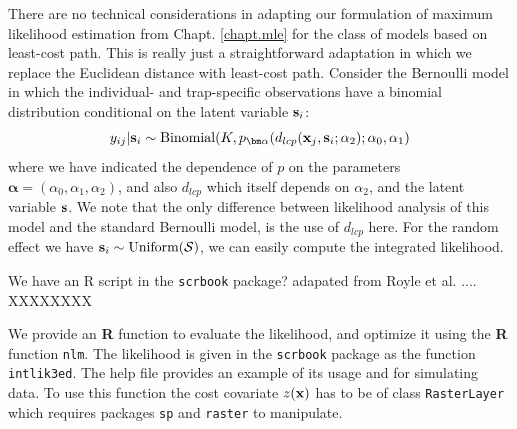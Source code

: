 There are no technical considerations in adapting our
 formulation of maximum likelihood estimation
\citep{borchers_efford:2008} from Chapt. \ref{chapt.mle} for the class
of models based on least-cost path. This is really just a
straightforward adaptation in which we replace the Euclidean distance
with least-cost path.
Consider the Bernoulli model in which 
the individual- and trap-specific observations have a binomial
distribution conditional on the latent variable ${\bf s}_{i}$:
\begin{equation}
  y_{ij}| {\bf s}_{i} \sim \mbox{Binomial}(K, p_{\bm \alpha}(d_{lcp}({\bf x}_{j},{\bf s}_{i};\alpha_{2}); \alpha_{0}, \alpha_{1})
\label{ecoldist.eq.cond-on-s}
\end{equation}
where we have indicated the dependence of $p$ on the parameters
${\bm \alpha} =(\alpha_{0},\alpha_{1},\alpha_{2})$, and also $d_{lcp}$ which
itself depends on $\alpha_{2}$, and the latent variable ${\bf s}$.
We note that the only difference between likelihood analysis of this
model and the standard Bernoulli model, is the use of $d_{lcp}$ here. 
For the random effect we have ${\bf s}_{i} \sim  \mbox{Uniform}({\cal
  S})$, we can easily compute the integrated likelihood.

We have an R script in the \mbox{\tt scrbook} package?
adapated from Royle et al. .... XXXXXXXX

We provide an {\bf R} function to evaluate the likelihood, and
optimize it 
using the {\bf R} function \mbox{\tt nlm}.
The likelihood is given in the {\tt scrbook} package as the function
\mbox{\tt intlik3ed}. The help file
provides an example of its usage and for simulating data.
To use this function the cost covariate $z({\bf x})$ has to be of class
\mbox{\tt RasterLayer} which requires packages \mbox{\tt sp} and
\mbox{\tt raster} to manipulate.


